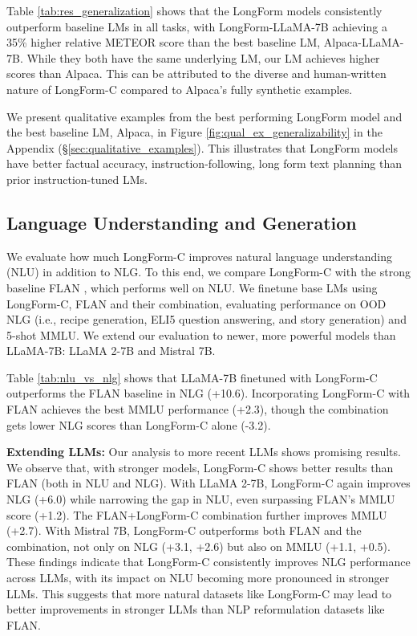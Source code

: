 		Table \ref{tab:res_generalization}
shows that the LongForm models consistently outperform baseline LMs in all tasks, with LongForm-LLaMA-7B achieving a 35\% higher relative METEOR score than the best baseline LM, Alpaca-LLaMA-7B. While they both have the same underlying LM, our LM achieves higher scores than Alpaca. This can be attributed to the diverse and human-written nature of LongForm-C compared to Alpaca's fully synthetic examples.

We present qualitative examples from the best performing LongForm model and the best baseline LM, Alpaca, in Figure \ref{fig:qual_ex_generalizability} in the Appendix
(\S\ref{sec:qualitative_examples}). This illustrates that LongForm models have better factual accuracy, instruction-following, long form text planning than prior instruction-tuned LMs.

	\subsection{Language Understanding and Generation}

	We evaluate how much LongForm-C improves natural language understanding (NLU) in addition to NLG. To this end, we compare LongForm-C with the strong baseline FLAN \cite{longpre2023flancollection}, which performs well on NLU. We finetune base LMs using LongForm-C, FLAN and their combination, evaluating performance on OOD NLG (i.e., recipe generation, ELI5 question answering, and story generation) and 5-shot MMLU. We extend our evaluation to newer, more powerful models than LLaMA-7B: LLaMA 2-7B and Mistral 7B.

	Table \ref{tab:nlu_vs_nlg} shows that LLaMA-7B finetuned with LongForm-C outperforms the FLAN baseline in NLG (+10.6). Incorporating LongForm-C with FLAN achieves the best MMLU performance (+2.3), though the combination gets lower NLG scores than LongForm-C alone (-3.2).

	 \textbf{Extending LLMs:} Our analysis to more recent LLMs shows promising results. We observe that, with stronger models, LongForm-C shows better results than FLAN (both in NLU and NLG). With LLaMA 2-7B, LongForm-C again improves NLG (+6.0) while narrowing the gap in NLU, even surpassing FLAN's MMLU score (+1.2). The FLAN+LongForm-C combination further improves MMLU  (+2.7). With Mistral 7B, LongForm-C outperforms both FLAN and the combination, not only on NLG (+3.1, +2.6) but also on MMLU (+1.1, +0.5). These findings indicate that LongForm-C consistently improves NLG performance across LLMs, with its impact on NLU becoming more pronounced in stronger LLMs. This suggests that more natural datasets like LongForm-C may lead to better improvements in stronger LLMs than NLP reformulation datasets like FLAN.

